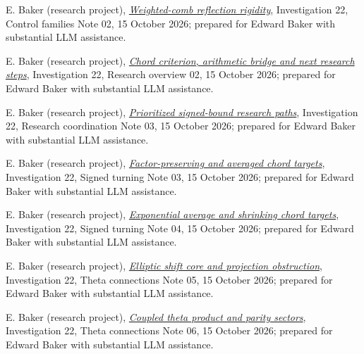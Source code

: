 \documentclass[11pt]{article}
\numberwithin{equation}{section}
\theoremstyle{definition}
\theoremstyle{remark}
\newcommand{\researchnote}[2]{\href{../../papers/investigations-2/active/22_theta_manifold_geometry/#1}{#2}}
\begin{document}
\begin{thebibliography}{99}
E. Baker (research project),
\researchnote{notes/05_control_families/02_WEIGHTED_COMB_REFLECTION_RIGIDITY_20261015.md}{\emph{Weighted-comb reflection rigidity}},
Investigation 22, Control families Note 02, 15 October 2026;
prepared for Edward Baker with substantial LLM assistance.

E. Baker (research project),
\researchnote{research-overview/02_CHORD_CRITERION_AND_ARITHMETIC_BRIDGE_20261015.md}{\emph{Chord criterion, arithmetic bridge and next research steps}},
Investigation 22, Research overview 02, 15 October 2026;
prepared for Edward Baker with substantial LLM assistance.

E. Baker (research project),
\researchnote{notes/00_research_coordination/03_PRIORITIZED_SIGNED_BOUND_RESEARCH_PATHS_20261015.md}{\emph{Prioritized signed-bound research paths}},
Investigation 22, Research coordination Note 03, 15 October 2026;
prepared for Edward Baker with substantial LLM assistance.

E. Baker (research project),
\researchnote{notes/02_signed_turning_control/03_FACTOR_PRESERVING_AND_AVERAGED_CHORD_TARGETS_20261015.md}{\emph{Factor-preserving and averaged chord targets}},
Investigation 22, Signed turning Note 03, 15 October 2026;
prepared for Edward Baker with substantial LLM assistance.

E. Baker (research project),
\researchnote{notes/02_signed_turning_control/04_EXPONENTIAL_AVERAGE_AND_SHRINKING_CHORD_TARGETS_20261015.md}{\emph{Exponential average and shrinking chord targets}},
Investigation 22, Signed turning Note 04, 15 October 2026;
prepared for Edward Baker with substantial LLM assistance.

E. Baker (research project),
\researchnote{notes/03_theta_bundles_and_connections/05_ELLIPTIC_SHIFT_CORE_AND_PROJECTION_OBSTRUCTION_20261015.md}{\emph{Elliptic shift core and projection obstruction}},
Investigation 22, Theta connections Note 05, 15 October 2026;
prepared for Edward Baker with substantial LLM assistance.

E. Baker (research project),
\researchnote{notes/03_theta_bundles_and_connections/06_COUPLED_THETA_PRODUCT_AND_PARITY_SECTORS_20261015.md}{\emph{Coupled theta product and parity sectors}},
Investigation 22, Theta connections Note 06, 15 October 2026;
prepared for Edward Baker with substantial LLM assistance.


\end{thebibliography}
\end{document}
